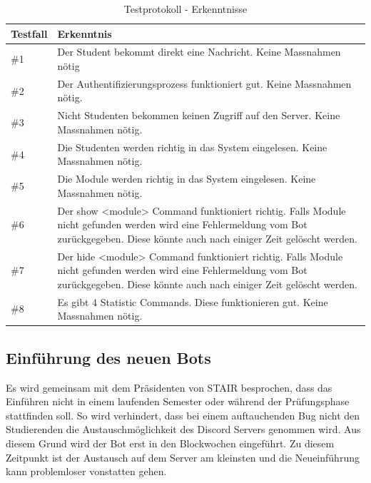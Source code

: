 \documentclass[a4paper, table]{article}
\begin{document}
\begin{table}[h]
    \centering
    \begin{tabular}{|l|p{30em}|}
        \hline
        \rowcolor[gray]{.9} Testfall & Erkenntnis \\
        \hline
        \#1 & Der Student bekommt direkt eine Nachricht. Keine Massnahmen nötig \\
        \hline
        \#2 & Der Authentifizierungsprozess funktioniert gut. Keine Massnahmen nötig. \\
        \hline
        \#3 & Nicht Studenten bekommen keinen Zugriff auf den Server. Keine Massnahmen nötig. \\
        \hline
        \#4 & Die Studenten werden richtig in das System eingelesen. Keine Massnahmen nötig. \\
        \hline
        \#5 & Die Module werden richtig in das System eingelesen. Keine Massnahmen nötig. \\
        \hline
        \#6 & 
            Der show <module> Command funktioniert richtig.
            Falls Module nicht gefunden werden wird eine Fehlermeldung vom Bot zurückgegeben.
            Diese könnte auch nach einiger Zeit gelöscht werden. \\
        \hline
        \#7 & 
            Der hide <module> Command funktioniert richtig.
            Falls Module nicht gefunden werden wird eine Fehlermeldung vom Bot zurückgegeben.
            Diese könnte auch nach einiger Zeit gelöscht werden. \\
        \hline
        \#8 & Es gibt 4 Statistic Commands. Diese funktionieren gut. Keine Massnahmen nötig. \\
        \hline
    \end{tabular}
    \caption{Testprotokoll - Erkenntnisse}
    \label{tab: test-protocol-knowledge}
\end{table}

\subsection{Einführung des neuen Bots}
Es wird gemeinsam mit dem Präsidenten von STAIR besprochen, dass das Einführen nicht in einem laufenden Semester oder während der Prüfungsphase stattfinden soll. 
So wird verhindert, dass bei einem auftauchenden Bug nicht den Studierenden die Austauschmöglichkeit des Discord Servers genommen wird.
Aus diesem Grund wird der Bot erst in den Blockwochen eingeführt.
Zu diesem Zeitpunkt ist der Austausch auf dem Server am kleinsten und die Neueinführung kann problemloser vonstatten gehen.
\end{document}
